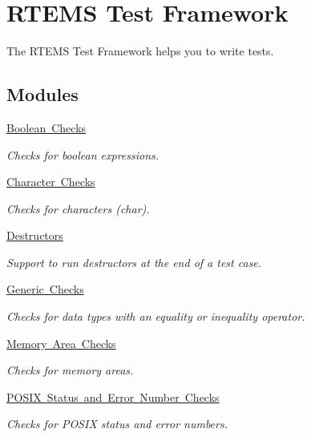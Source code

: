 \hypertarget{group__RTEMSTestFramework}{}\section{R\+T\+E\+MS Test Framework}
\label{group__RTEMSTestFramework}


The R\+T\+E\+MS Test Framework helps you to write tests.  


\subsection*{Modules}
\begin{DoxyCompactItemize}
\item 
\mbox{\hyperlink{group__RTEMSTestFrameworkChecksBool}{Boolean Checks}}
\begin{DoxyCompactList}\small\item\em Checks for boolean expressions. \end{DoxyCompactList}\item 
\mbox{\hyperlink{group__RTEMSTestFrameworkChecksChar}{Character Checks}}
\begin{DoxyCompactList}\small\item\em Checks for characters (char). \end{DoxyCompactList}\item 
\mbox{\hyperlink{group__RTEMSTestFrameworkDestructors}{Destructors}}
\begin{DoxyCompactList}\small\item\em Support to run destructors at the end of a test case. \end{DoxyCompactList}\item 
\mbox{\hyperlink{group__RTEMSTestFrameworkChecksGeneric}{Generic Checks}}
\begin{DoxyCompactList}\small\item\em Checks for data types with an equality or inequality operator. \end{DoxyCompactList}\item 
\mbox{\hyperlink{group__RTEMSTestFrameworkChecksMemStr}{Memory Area Checks}}
\begin{DoxyCompactList}\small\item\em Checks for memory areas. \end{DoxyCompactList}\item 
\mbox{\hyperlink{group__RTEMSTestFrameworkChecksPSX}{P\+O\+S\+I\+X Status and Error Number Checks}}
\begin{DoxyCompactList}\small\item\em Checks for P\+O\+S\+IX status and error numbers. \end{DoxyCompactList}\item 

\end{DoxyCompactItemize}

